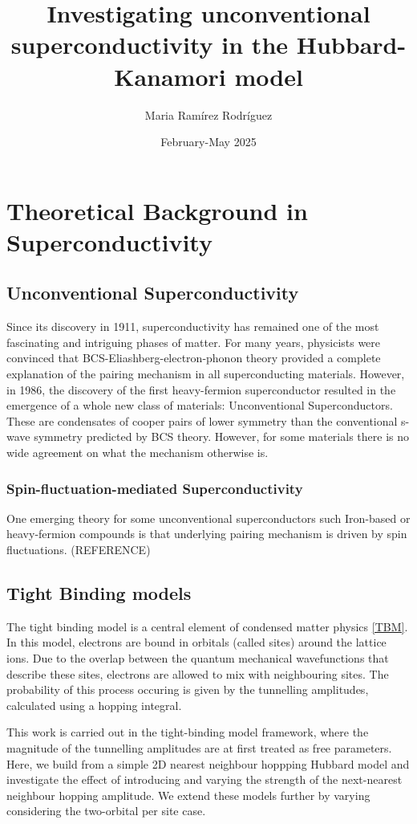 \documentclass[12pt]{article}
\title{Investigating unconventional superconductivity in the Hubbard-Kanamori model}
\author{Maria Ramírez Rodríguez}
\date{February-May 2025}
\begin{document}
\maketitle
\tableofcontents 


\section{Theoretical Background in Superconductivity}




\subsection{Unconventional Superconductivity}

Since its discovery in 1911\cite{onnes1911superconductivity}, superconductivity has remained one of the most fascinating and intriguing phases of matter. 
For many years, physicists were convinced that BCS-Eliashberg-electron-phonon theory \cite{schrieffer2018theory} provided a complete explanation of the pairing mechanism in all superconducting materials. 
However, in 1986, the discovery of the first heavy-fermion superconductor\cite{bednorz1986possible} resulted in the emergence of a whole new class of materials: Unconventional Superconductors. 
These are condensates of cooper pairs of lower symmetry than the conventional s-wave symmetry predicted by BCS theory. However, for some materials there is no wide agreement on what the mechanism otherwise is. 


\subsubsection{Spin-fluctuation-mediated Superconductivity}

One emerging theory for some unconventional superconductors such Iron-based or heavy-fermion compounds is that underlying pairing mechanism is driven by spin fluctuations. (REFERENCE)





\subsection{Tight Binding models}

The tight binding model is a central element of condensed matter physics \eqref{TBM}. In this model, electrons are bound in orbitals (called sites) around the lattice ions.
Due to the overlap between the quantum mechanical wavefunctions that describe these sites, electrons are allowed to mix with neighbouring sites. The probability of this process occuring is given by the tunnelling amplitudes, calculated using a hopping integral. \par
\medskip
\noindent This work is carried out in the tight-binding model framework, where the magnitude of the tunnelling amplitudes are at first treated as free parameters. 
Here, we build from a simple 2D nearest neighbour hoppping Hubbard model and investigate the effect of introducing and varying the strength of the next-nearest neighbour hopping amplitude.
We extend these models further by varying considering the two-orbital per site case. 
\end{document}
